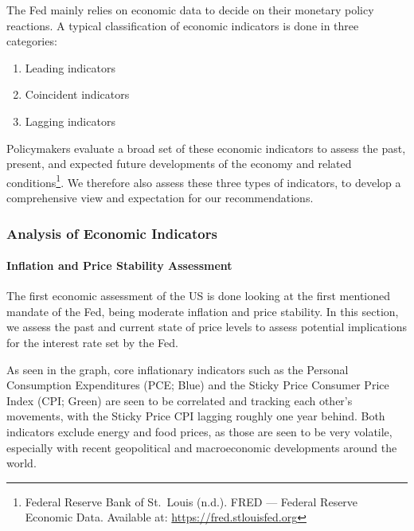 \documentclass[11pt,a4paper]{article}
\begin{document}
The Fed mainly relies on economic data to decide on their monetary policy reactions. A typical classification of economic indicators is done in three categories:
\begin{enumerate}[label=\Roman*.]
\item Leading indicators
\item Coincident indicators
\item Lagging indicators
\end{enumerate}

Policymakers evaluate a broad set of these economic indicators to assess the past, present, and expected future developments of the economy and related conditions\footnote{Federal Reserve Bank of St.\ Louis (n.d.). FRED --- Federal Reserve Economic Data. Available at: \url{https://fred.stlouisfed.org}}. We therefore also assess these three types of indicators, to develop a comprehensive view and expectation for our recommendations.

\subsubsection{Analysis of Economic Indicators}

\paragraph{Inflation and Price Stability Assessment}

The first economic assessment of the US is done looking at the first mentioned mandate of the Fed, being moderate inflation and price stability. In this section, we assess the past and current state of price levels to assess potential implications for the interest rate set by the Fed.


As seen in the graph, core inflationary indicators such as the Personal Consumption Expenditures (PCE; Blue) and the Sticky Price Consumer Price Index (CPI; Green) are seen to be correlated and tracking each other's movements, with the Sticky Price CPI lagging roughly one year behind. Both indicators exclude energy and food prices, as those are seen to be very volatile, especially with recent geopolitical and macroeconomic developments around the world.
\end{document}
